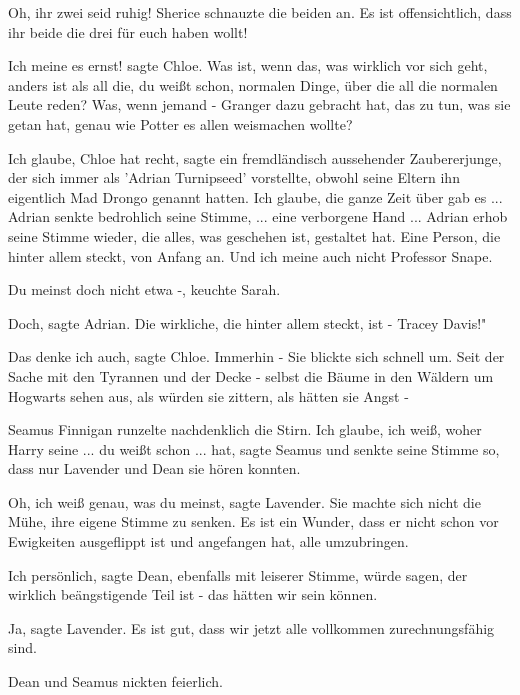 \glqq{}Oh, ihr zwei seid ruhig!\grqq{} Sherice schnauzte die beiden an. \glqq{}Es
ist offensichtlich, dass ihr beide die drei für euch haben wollt!\grqq{}

\glqq{}Ich meine es ernst!\grqq{} sagte Chloe. \glqq{}Was ist, wenn das, was
wirklich vor sich geht, anders ist als all die, du weißt schon, normalen Dinge,
über die all die normalen Leute reden? Was, wenn jemand - Granger dazu gebracht
hat, das zu tun, was sie getan hat, genau wie Potter es allen weismachen
wollte?\grqq{}

\glqq{}Ich glaube, Chloe hat recht\grqq{}, sagte ein fremdländisch aussehender
Zaubererjunge, der sich immer als 'Adrian Turnipseed' vorstellte, obwohl seine
Eltern ihn eigentlich Mad Drongo genannt hatten. \glqq{}Ich glaube, die ganze
Zeit über gab es ...\grqq{} Adrian senkte bedrohlich seine Stimme, \glqq{}...
eine verborgene Hand ...\grqq{} Adrian erhob seine Stimme wieder, \glqq{}die
alles, was geschehen ist, gestaltet hat. Eine Person, die hinter allem steckt,
von Anfang an. Und ich meine auch nicht Professor Snape.\grqq{}

\glqq{}Du meinst doch nicht etwa -\grqq{}, keuchte Sarah.

\glqq{}Doch\grqq{}, sagte Adrian. \glqq{}Die wirkliche, die hinter allem steckt,
ist - Tracey Davis!"

\glqq{}Das denke ich auch\grqq{}, sagte Chloe. \glqq{}Immerhin -\grqq{} Sie
blickte sich schnell um. \glqq{}Seit der Sache mit den Tyrannen und der Decke -
selbst die Bäume in den Wäldern um Hogwarts sehen aus, als würden sie zittern,
als hätten sie Angst -\grqq{}

Seamus Finnigan runzelte nachdenklich die Stirn. \glqq{}Ich glaube, ich weiß,
woher Harry seine ... du weißt schon ... hat\grqq{}, sagte Seamus und senkte
seine Stimme so, dass nur Lavender und Dean sie hören konnten.

\glqq{}Oh, ich weiß genau, was du meinst\grqq{}, sagte Lavender. Sie machte sich
nicht die Mühe, ihre eigene Stimme zu senken. \glqq{}Es ist ein Wunder, dass er
nicht schon vor Ewigkeiten ausgeflippt ist und angefangen hat, alle
umzubringen.\grqq{}

\glqq{}Ich persönlich\grqq{}, sagte Dean, ebenfalls mit leiserer Stimme, \glqq{}
würde sagen, der wirklich beängstigende Teil ist - das hätten wir sein
können.\grqq{}

\glqq{}Ja\grqq{}, sagte Lavender. \glqq{}Es ist gut, dass wir jetzt alle
vollkommen zurechnungsfähig sind.\grqq{}

Dean und Seamus nickten feierlich.

